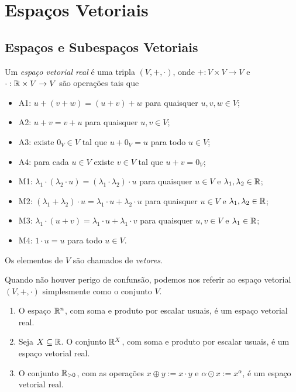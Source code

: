 
\chapter{Espaços Vetoriais}

\section{Espaços e Subespaços Vetoriais}

\begin{definition}
    Um \emph{espaço vetorial real} é uma tripla $(V,+,\cdot)$, onde $+ : V \times V \to V$ e $\cdot : \mathbb{R} \times V \to V$ são operações tais que
        \begin{itemize}
            \item A1: $u + (v + w) = (u + v) + w$ para quaisquer $u,v,w \in V$;
            \item A2: $u + v = v + u$ para quaisquer $u,v \in V$;
            \item A3: existe $0_V \in V$ tal que $u + 0_V = u$ para todo $u \in V$;
            \item A4: para cada $u \in V$ existe $v \in V$ tal que $u+v=0_V$;
            \item M1: $\lambda_1 \cdot (\lambda_2 \cdot u) = (\lambda_1 \cdot \lambda_2) \cdot u$ para quaisquer $u \in V$ e $\lambda_1,\lambda_2 \in \mathbb{R}$;
            \item M2: $(\lambda_1 + \lambda_2) \cdot u = \lambda_1 \cdot u + \lambda_2 \cdot u$ para quaisquer $u \in V$ e $\lambda_1,\lambda_2 \in \mathbb{R}$;
            \item M3: $\lambda_1 \cdot (u + v) = \lambda_1 \cdot u + \lambda_1 \cdot v$ para quaisquer $u,v \in V$ e $\lambda_1 \in \mathbb{R}$;
            \item M4: $1 \cdot u = u$ para todo $u \in V$.
        \end{itemize}
    Os elementos de $V$ são chamados de \emph{vetores}.
\end{definition}

\begin{remark}
    Quando não houver perigo de confunsão, podemos nos referir ao espaço vetorial $(V, +, \cdot)$ simplesmente como o conjunto $V$.
\end{remark}

\begin{example}
    \leavevmode
        \begin{enumerate}[leftmargin=*, align=left, label=\textbf{(\alph*)}]
            \item O espaço $\mathbb{R}^n$, com soma e produto por escalar usuais, é um espaço vetorial real.
            \item Seja $X \subseteq \mathbb{R}$. O conjunto $\mathbb{R}^X$, com soma e produto por escalar usuais, é um espaço vetorial real.
            \item O conjunto $\mathbb{R}_{>0}$, com as operações $x\oplus y:=x \cdot y$ e $\alpha \odot x := x^{\alpha}$, é um espaço vetorial real.
        \end{enumerate}
\end{example}

